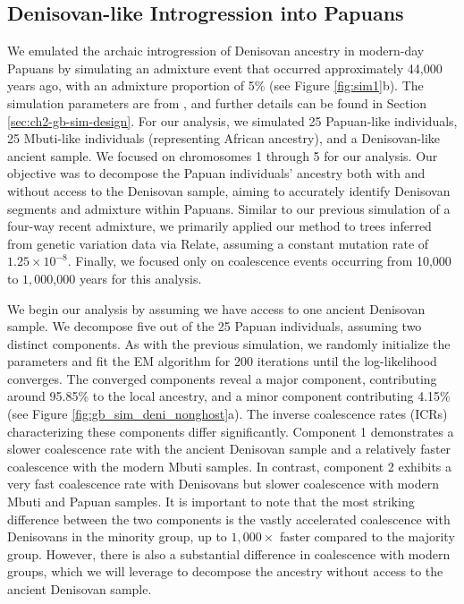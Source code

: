 \clearpage

\subsection{Denisovan-like Introgression into Papuans}


We emulated the archaic introgression of Denisovan ancestry in modern-day Papuans by simulating an admixture event that occurred approximately 44,000 years ago, with an admixture proportion of 5\% (see Figure \ref{fig:sim1}b). The simulation parameters are from \cite{skov2018detecting}, and further details can be found in Section \ref{sec:ch2-gb-sim-design}. For our analysis, we simulated 25 Papuan-like individuals, 25 Mbuti-like individuals (representing African ancestry), and a Denisovan-like ancient sample. We focused on chromosomes 1 through 5 for our analysis. Our objective was to decompose the Papuan individuals' ancestry both with and without access to the Denisovan sample, aiming to accurately identify Denisovan segments and admixture within Papuans. Similar to our previous simulation of a four-way recent admixture, we primarily applied our method to trees inferred from genetic variation data via Relate, assuming a constant mutation rate of $1.25 \times 10^{-8}$. Finally, we focused only on coalescence events occurring from 10,000 to $1{,}000$,000 years for this analysis.

We begin our analysis by assuming we have access to one ancient Denisovan sample. We decompose five out of the 25 Papuan individuals, assuming two distinct components. As with the previous simulation, we randomly initialize the parameters and fit the EM algorithm for 200 iterations until the log-likelihood converges. The converged components reveal a major component, contributing around 95.85\% to the local ancestry, and a minor component contributing 4.15\% (see Figure \ref{fig:gb_sim_deni_nonghost}a). The inverse coalescence rates (ICRs) characterizing these components differ significantly. Component 1 demonstrates a slower coalescence rate with the ancient Denisovan sample and a relatively faster coalescence with the modern Mbuti samples. In contrast, component 2 exhibits a very fast coalescence rate with Denisovans but slower coalescence with modern Mbuti and Papuan samples. It is important to note that the most striking difference between the two components is the vastly accelerated coalescence with Denisovans in the minority group, up to $1{,}000 \times$ faster compared to the majority group. However, there is also a substantial difference in coalescence with modern groups, which we will leverage to decompose the ancestry without access to the ancient Denisovan sample.

